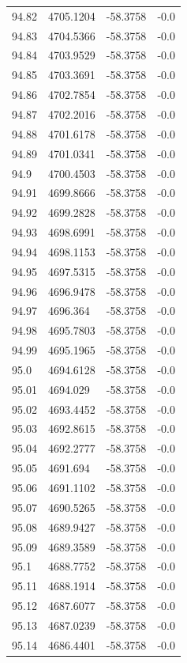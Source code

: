 \begin{table}[H]
\begin{tabular}{llll}
94.82 & 4705.1204 & -58.3758 & -0.0 \\
94.83 & 4704.5366 & -58.3758 & -0.0 \\
94.84 & 4703.9529 & -58.3758 & -0.0 \\
94.85 & 4703.3691 & -58.3758 & -0.0 \\
94.86 & 4702.7854 & -58.3758 & -0.0 \\
94.87 & 4702.2016 & -58.3758 & -0.0 \\
94.88 & 4701.6178 & -58.3758 & -0.0 \\
94.89 & 4701.0341 & -58.3758 & -0.0 \\
94.9 & 4700.4503 & -58.3758 & -0.0 \\
94.91 & 4699.8666 & -58.3758 & -0.0 \\
94.92 & 4699.2828 & -58.3758 & -0.0 \\
94.93 & 4698.6991 & -58.3758 & -0.0 \\
94.94 & 4698.1153 & -58.3758 & -0.0 \\
94.95 & 4697.5315 & -58.3758 & -0.0 \\
94.96 & 4696.9478 & -58.3758 & -0.0 \\
94.97 & 4696.364 & -58.3758 & -0.0 \\
94.98 & 4695.7803 & -58.3758 & -0.0 \\
94.99 & 4695.1965 & -58.3758 & -0.0 \\
95.0 & 4694.6128 & -58.3758 & -0.0 \\
95.01 & 4694.029 & -58.3758 & -0.0 \\
95.02 & 4693.4452 & -58.3758 & -0.0 \\
95.03 & 4692.8615 & -58.3758 & -0.0 \\
95.04 & 4692.2777 & -58.3758 & -0.0 \\
95.05 & 4691.694 & -58.3758 & -0.0 \\
95.06 & 4691.1102 & -58.3758 & -0.0 \\
95.07 & 4690.5265 & -58.3758 & -0.0 \\
95.08 & 4689.9427 & -58.3758 & -0.0 \\
95.09 & 4689.3589 & -58.3758 & -0.0 \\
95.1 & 4688.7752 & -58.3758 & -0.0 \\
95.11 & 4688.1914 & -58.3758 & -0.0 \\
95.12 & 4687.6077 & -58.3758 & -0.0 \\
95.13 & 4687.0239 & -58.3758 & -0.0 \\
95.14 & 4686.4401 & -58.3758 & -0.0 \\

\end{tabular}
\end{table}
